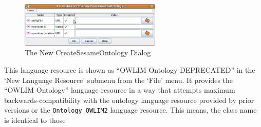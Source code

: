\begin{figure}[htbp]
\begin{center}
\includegraphics[width=0.6\textwidth]{ontology_lrcreate_new.png}
\caption{The New CreateSesameOntology Dialog}
\label{fig:ontology_lrcreate_new}
\end{center}
\end{figure}


This language resource is shown as ``OWLIM Ontology DEPRECATED'' in the `New
Language Resource' submenu from the `File' menu. It provides the
``OWLIM Ontology'' language resource in
a way that attempts maximum backwards-compatibility with the ontology language
resource provided by prior versions or the \texttt{Ontology\_OWLIM2} 
language resource. This means, the class name is identical to those
